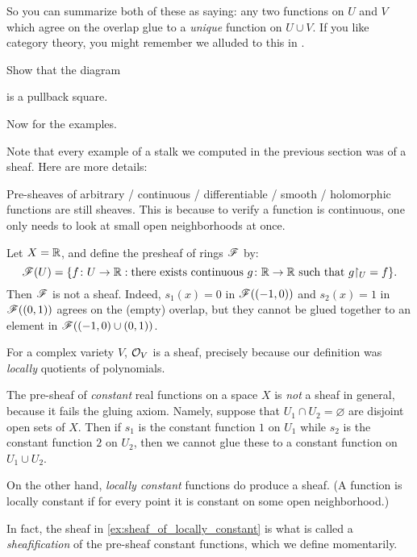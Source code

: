 So you can summarize both of these as saying:
any two functions on $U$ and $V$
which agree on the overlap
glue to a \emph{unique} function on $U \cup V$.
If you like category theory,
you might remember we alluded to this in .
\begin{exercise}
	Show that the diagram
	\begin{center}
	\end{center}
	is a pullback square.
\end{exercise}

Now for the examples.
\begin{example}
	Note that every example of a stalk we computed
	in the previous section was of a sheaf.
	Here are more details:
	\begin{enumerate}[(a)]
		\ii Pre-sheaves of arbitrary / continuous / differentiable / smooth
		/ holomorphic functions are still sheaves.
		This is because to verify a function is continuous,
		one only needs to look at small open neighborhoods at once.

		\ii Let $X = \mathbb R$, and define the presheaf of rings $\mathscr F$ by:
		\[
			\SF(U) = \{ f \colon U \to \RR: \text{there exists continuous $g
			\colon \RR \to \RR$ such that $g\restrict{U} = f$} \}.
		\]
		Then $\mathscr F$ is not a sheaf. Indeed, $s_1(x) = 0$ in $\mathscr F((-1, 0))$
		and $s_2(x) = 1$ in $\mathscr F((0, 1))$ agrees on the (empty) overlap,
		but they cannot be glued together to an element in $\mathscr F((-1, 0) \cup(0,
		1))$.

		\ii For a complex variety $V$, $\mathcal O_V$ is a sheaf,
		precisely because our definition was \emph{locally} quotients
		of polynomials.

		\ii The pre-sheaf of \emph{constant} real functions on a space $X$
		is \emph{not} a sheaf in general, because it fails the gluing axiom.
		Namely, suppose that $U_1 \cap U_2 = \varnothing$
		are disjoint open sets of $X$.
		Then if $s_1$ is the constant function $1$ on $U_1$
		while $s_2$ is the constant function $2$ on $U_2$,
		then we cannot glue these to a constant function on $U_1 \cup U_2$.

		\ii \label{ex:sheaf_of_locally_constant} On the other hand,
		\emph{locally constant} functions
		do produce a sheaf. (A function is locally constant
		if for every point it is constant on some open neighborhood.)
	\end{enumerate}
	In fact, the sheaf in \ref{ex:sheaf_of_locally_constant} is what is called
	a \emph{sheafification}
	of the pre-sheaf constant functions, which we define momentarily.
\end{example}

